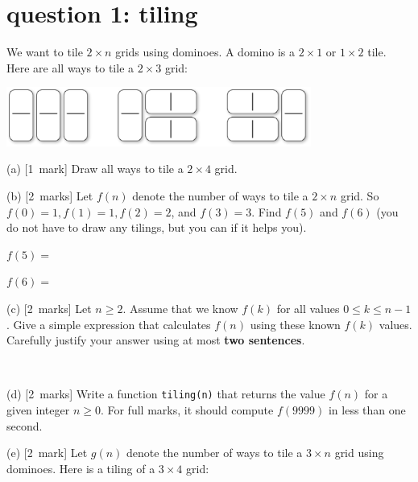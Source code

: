 \documentclass[12pt]{article}
\newcommand{\mymarks}[1]{\mbox{\small [#1 marks]}}
\newcommand{\mymark}[1]{\mbox{\small [#1 mark]}}
\begin{document}

\newpage
\section*{question 1: tiling}

We want to tile $2 \times n$ grids using dominoes.
A domino is a $2 \times 1$ or $1\times 2$ tile.
Here are all ways to tile a $2 \times 3$ grid:

\vspace{-3mm}
\begin{center}
\includegraphics[width=100mm]{Figures/23-tilings.eps}
\end{center}
\vspace{-5mm}


\noindent
(a) \mymark{1}
Draw all ways to tile a $2 \times 4$ grid.

\vfill

\noindent
(b) \mymarks{2}
Let $f(n)$ denote the number of ways to tile a $2 \times n$ grid. So $f(0) = 1, f(1) = 1, f(2) = 2$, and $f(3) = 3$.
Find $f(5)$ and $f(6)$ (you do not have to draw any tilings, 
but you can if it helps you).

\vfill
\hfill $f(5)=$ ~ ~ ~ ~

\vfill
\hfill $f(6)=$ ~ ~ ~ ~
\vfill

\noindent
(c) \mymarks{2}
Let $n \geq 2$. Assume that we know $f(k)$ 
for all values $0 \leq k \leq n-1$. 
Give a simple expression that calculates $f(n)$ 
using these known $f(k)$ values. 
Carefully justify your answer using at most {\bf two sentences}.

\vfill\vfill~

\newpage
\noindent
(d) \mymarks{2}
Write a function \texttt{tiling(n)} that returns the value $f(n)$ for a given integer $n \geq 0$. For full marks,
it should compute $f(9999)$ in less than one second.

\vfill
\vfill
\vfill

\noindent
(e) \mymark{2}
Let $g(n)$ denote the number of ways to tile a $3 \times n$ grid 
using dominoes. Here is a tiling of a $3 \times 4$ grid:
\end{document}
